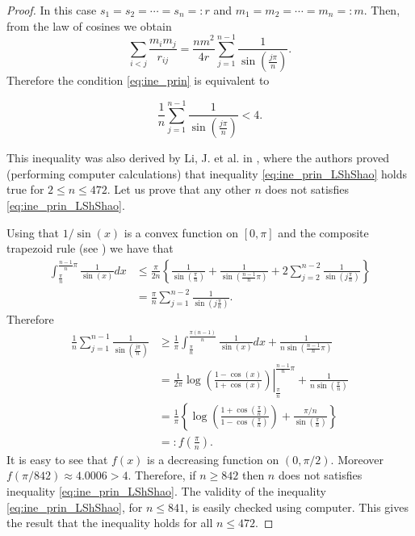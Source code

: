 \documentclass[twoside]{article}
\theoremstyle{remark}
\begin{document}
\begin{proof}
In this case $s_1=s_2=\cdots=s_n=:r$ and $m_1=m_2=\cdots=m_n=:m$. Then, from the law of cosines we obtain
\[
 \sum_{i<j}\frac{m_im_j}{r_{ij}}=\frac{nm^2}{4r}\sum_{j=1}^{n-1}\frac{1}{\sin\left(\frac{j\pi}{n}\right)}.
\]
Therefore the condition \eqref{eq:ine_prin} is equivalent to

\begin{equation}\label{eq:ine_prin_LShShao}
  \frac1n\sum_{j=1}^{n-1}\frac{1}{\sin\left(\frac{j\pi}{n}\right)}<4.
\end{equation}

This inequality was also derived by Li, J. et al. in \cite{li2013characterization}, where the authors proved (performing computer calculations) that inequality \eqref{eq:ine_prin_LShShao} holds true for $2\leq n\leq 472$. Let us prove that any other $n$ does not satisfies \eqref{eq:ine_prin_LShShao}.


Using that $1/\sin (x)$ is a convex function on $[0,\pi]$ and the composite trapezoid rule (see \cite{kincaid1991numerical}) we have that
\[
\begin{split}
 \int_{\frac{\pi}{n}}^{\frac{n-1}{n}\pi}\frac{1}{\sin (x)}dx&\leq \frac{\pi}{2n}\left\{ \frac{1}{\sin(\frac{\pi}{n})} + \frac{1}{\sin(\frac{n-1}{n}\pi)} +2\sum_{j=2}^{n-2}\frac{1}{\sin(j\frac{\pi}{n})} \right\}\\
 &=\frac{\pi}{n}\sum_{j=1}^{n-2}\frac{1}{\sin(j\frac{\pi}{n})}.
\end{split}
\]
Therefore
\[
\begin{split}
 \frac1n \sum_{j=1}^{n-1}\frac{1}{\sin\left(\frac{j\pi}{n}\right)}&\geq \frac{1}{\pi}\int_{\frac{\pi}{n}}^{\frac{\pi(n-1)}{n}}\frac{1}{\sin (x)}dx+\frac{1}{n\sin\left(\frac{n-1}{n}\pi\right)}\\
 &=\left.\frac{1}{2\pi}\log \left( \frac{1-\cos(x)}{1+\cos(x)}\right)\right|_{\frac{\pi}{n}}^{\frac{n-1}{n}\pi}+\frac{1}{n\sin\left(\frac{\pi}{n}\right)}\\
 &=\frac{1}{\pi}\left\{\log \left(\frac{1+\cos(\frac{\pi}{n})}{1-\cos(\frac{\pi}{n})}\right)+\frac{\pi/n}{\sin\left(\frac{\pi}{n}\right)}\right\}\\
 &=:f\left(\frac{\pi}{n} \right).
 \end{split}
\]
It is easy to see that $f(x)$ is a decreasing function on $(0,\pi/2)$. Moreover $f(\pi/842)\approx 4.0006>4$. Therefore, if $n\geq 842$ then $n$ does not satisfies inequality \eqref{eq:ine_prin_LShShao}. The validity of the inequality \eqref{eq:ine_prin_LShShao}, for $n\leq 841$, is easily checked using computer. This gives the result that the inequality holds for all $n \leq 472$.
\end{proof}
\end{document}
